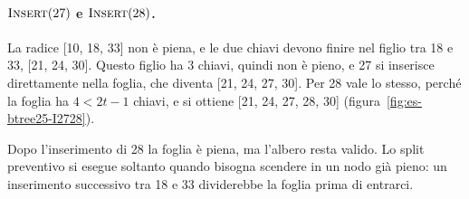 \paragraph{$\textsc{Insert}(27)$ e $\textsc{Insert}(28)$.}
La radice [10, 18, 33] non è piena, e le due chiavi devono finire nel figlio tra 18 e 33, [21, 24, 30]. Questo figlio ha $3$ chiavi, quindi non è pieno, e 27 si inserisce direttamente nella foglia, che diventa [21, 24, 27, 30]. Per 28 vale lo stesso, perché la foglia ha $4 < 2t-1$ chiavi, e si ottiene [21, 24, 27, 28, 30] (figura~\ref{fig:es-btree25-I2728}).

Dopo l'inserimento di 28 la foglia è piena, ma l'albero resta valido. Lo split preventivo si esegue soltanto quando bisogna scendere in un nodo già pieno: un inserimento successivo tra 18 e 33 dividerebbe la foglia prima di entrarci.

